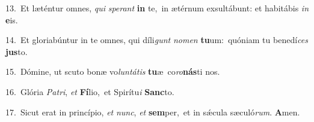 {\numbfont\textcolor{\numbcolor}{13.}}~Et læténtur omnes, \textit{qui} \textit{spe}\-\textit{rant} \textbf{in} te,~\star in ætérnum exsultábunt: et habitábis \textit{in} \textbf{e}\-is.\par
{\numbfont\textcolor{\numbcolor}{14.}}~Et gloriabúntur in te omnes, qui díli\textit{gunt} \textit{no}\-\textit{men} \textbf{tu}\-um:~\star quóniam tu benedí\textit{ces} \textbf{jus}\-to.\par
{\numbfont\textcolor{\numbcolor}{15.}}~Dómine, ut scuto bonæ vo\-\textit{lun}\-\textit{tá}\textit{tis} \textbf{tu}\-æ~\star co\-\textit{ro}\-\textbf{nás}ti nos.\par
{\numbfont\textcolor{\numbcolor}{16.}}~Glória \textit{Pa}\-\textit{tri}, \textit{et} \textbf{Fí}\-lio,~\star et Spirítu\textit{i} \textbf{Sanc}\-to.\par
{\numbfont\textcolor{\numbcolor}{17.}}~Sicut erat in princípio, \textit{et} \textit{nunc}\-, \textit{et} \textbf{sem}\-per,~\star et in sǽcula sæculó\-\textit{rum}\-. \textbf{A}\-men.\par
